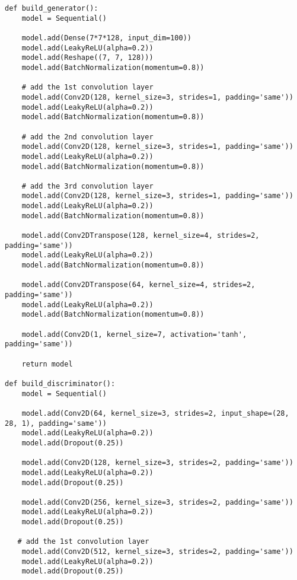 \begin{lstlisting}[style=mypython, caption= {Explore GAN with 6 Convolutional Layers in Generator \\ and 6 Convolutional Layers in Discriminator}]
    def build_generator():
    model = Sequential()
    
    model.add(Dense(7*7*128, input_dim=100))
    model.add(LeakyReLU(alpha=0.2))
    model.add(Reshape((7, 7, 128)))
    model.add(BatchNormalization(momentum=0.8))

    # add the 1st convolution layer
    model.add(Conv2D(128, kernel_size=3, strides=1, padding='same'))
    model.add(LeakyReLU(alpha=0.2))
    model.add(BatchNormalization(momentum=0.8))

    # add the 2nd convolution layer
    model.add(Conv2D(128, kernel_size=3, strides=1, padding='same'))
    model.add(LeakyReLU(alpha=0.2))
    model.add(BatchNormalization(momentum=0.8))

    # add the 3rd convolution layer
    model.add(Conv2D(128, kernel_size=3, strides=1, padding='same'))
    model.add(LeakyReLU(alpha=0.2))
    model.add(BatchNormalization(momentum=0.8))

    model.add(Conv2DTranspose(128, kernel_size=4, strides=2, padding='same'))
    model.add(LeakyReLU(alpha=0.2))
    model.add(BatchNormalization(momentum=0.8))

    model.add(Conv2DTranspose(64, kernel_size=4, strides=2, padding='same'))
    model.add(LeakyReLU(alpha=0.2))
    model.add(BatchNormalization(momentum=0.8))

    model.add(Conv2D(1, kernel_size=7, activation='tanh', padding='same'))

    return model

def build_discriminator():
    model = Sequential()
    
    model.add(Conv2D(64, kernel_size=3, strides=2, input_shape=(28, 28, 1), padding='same'))
    model.add(LeakyReLU(alpha=0.2))
    model.add(Dropout(0.25))

    model.add(Conv2D(128, kernel_size=3, strides=2, padding='same'))
    model.add(LeakyReLU(alpha=0.2))
    model.add(Dropout(0.25))

    model.add(Conv2D(256, kernel_size=3, strides=2, padding='same'))
    model.add(LeakyReLU(alpha=0.2))
    model.add(Dropout(0.25))

   # add the 1st convolution layer
    model.add(Conv2D(512, kernel_size=3, strides=2, padding='same'))
    model.add(LeakyReLU(alpha=0.2))
    model.add(Dropout(0.25))


\end{lstlisting}
